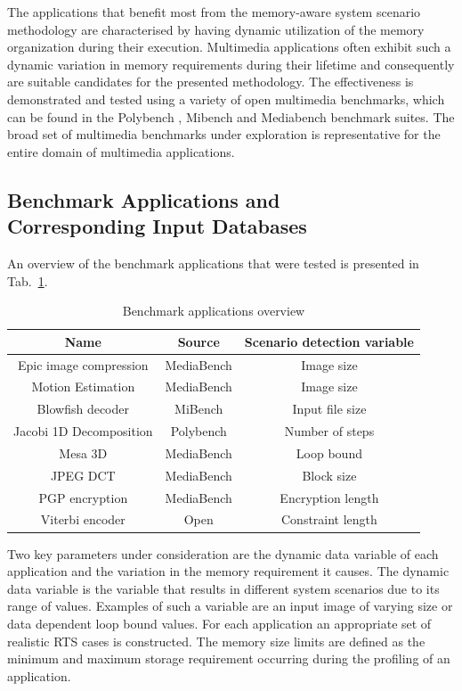 The applications that benefit most from the memory-aware system scenario methodology are characterised by having dynamic utilization of the memory organization during their execution. 
Multimedia applications often exhibit such a dynamic variation in memory requirements during their lifetime and consequently are suitable candidates for the presented methodology.
The effectiveness is demonstrated and tested using a variety of open multimedia benchmarks, which can be found in the Polybench \cite{Poly}, Mibench \cite{mibench} and Mediabench \cite{mediabench} benchmark suites.
The broad set of multimedia benchmarks under exploration is representative for the entire domain of multimedia applications. 

\subsection{Benchmark Applications and \\ Corresponding Input Databases}

An overview of the benchmark applications that were tested is presented in Tab.~\ref{tab:app1}. 

\begin{table}
\caption{Benchmark applications overview}
\label{tab:app1}
{
\begin{tabular}{|c|c|c|}
\hline
\textbf{Name} & \textbf{Source} & \textbf{Scenario detection variable}\\ 
\hline 
Epic image compression & MediaBench & Image size \\ 
\hline 
Motion Estimation & MediaBench 	& Image size \\ 
\hline 
Blowfish decoder & MiBench & Input file size \\ 
\hline 
Jacobi 1D Decomposition & Polybench & Number of steps \\ 
\hline 
Mesa 3D & MediaBench & Loop bound \\ 
\hline 
JPEG DCT & MediaBench & Block size \\ 
\hline 
PGP encryption & MediaBench & Encryption length \\ 
\hline 
Viterbi encoder & Open & Constraint length \\ 
\hline 
\end{tabular}}
\end{table}

Two key parameters under consideration are the dynamic data variable of each application and the variation in the memory requirement it causes. 
The dynamic data variable is the variable that results in different system scenarios due to its range of values. 
Examples of such a variable are an input image of varying size or data dependent loop bound values. 
For each application an appropriate set of realistic RTS cases is constructed. 
The memory size limits are defined as the minimum and maximum storage requirement occurring during the profiling of an application.

